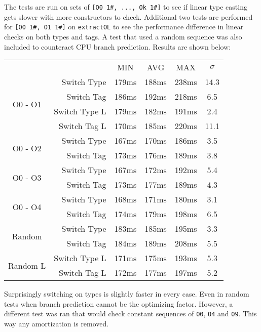 \documentclass[en]{pracamgr}
\begin{document}
The tests are run on sets of \texttt{[O0 1\#, ..., Ok 1\#]}
to see if linear type casting gets slower with more
constructors to check. Additional two tests are performed
for \texttt{[O0 1\#, O1 1\#]} on \texttt{extractOL} to see
the performance difference in linear checks on both types
and tags. A test that used a random sequence was also
included to counteract CPU branch prediction. Results are shown below:

\begin{center}
\begin{tabular}{c r c c c c}
    & & MIN & AVG & MAX & $\sigma$ \\
    \cline{3-6}
    
    \multirow{4}{*}{O0 - O1} & Switch Type & 179ms & 188ms & 238ms & 14.3 \\
    & Switch Tag & 186ms & 192ms & 218ms & 6.5 \\
    & Switch Type L & 179ms & 182ms & 191ms & 2.4 \\
    & Switch Tag L & 170ms & 185ms & 220ms & 11.1 \\
    \cline{2-6}

    \multirow{2}{*}{O0 - O2} & Switch Type & 167ms & 170ms & 186ms & 3.5 \\
    & Switch Tag & 173ms & 176ms & 189ms & 3.8 \\
    \cline{2-6}

    \multirow{2}{*}{O0 - O3} & Switch Type & 167ms & 172ms & 192ms & 5.4 \\
    & Switch Tag & 173ms & 177ms & 189ms & 4.3 \\
    \cline{2-6}

    \multirow{2}{*}{O0 - O4} & Switch Type & 168ms & 171ms & 180ms & 3.1 \\
    & Switch Tag & 174ms & 179ms & 198ms & 6.5 \\
    \cline{2-6}

    \multirow{2}{*}{Random} & Switch Type & 183ms & 185ms & 195ms & 3.3 \\
    & Switch Tag & 184ms & 189ms & 208ms & 5.5 \\
    \cline{2-6}

    \multirow{2}{*}{Random L} & Switch Type L & 171ms & 175ms & 193ms & 5.3 \\
    & Switch Tag L & 172ms & 177ms & 197ms & 5.2 \\
\end{tabular}
\end{center}

Surprisingly switching on types is slightly faster in every case.
Even in random tests when branch prediction cannot be the optimizing factor.
However, a different test was ran that would check
constant sequences of \texttt{O0}, \texttt{O4} and \texttt{O9}.
This way any amortization is removed.
\end{document}
